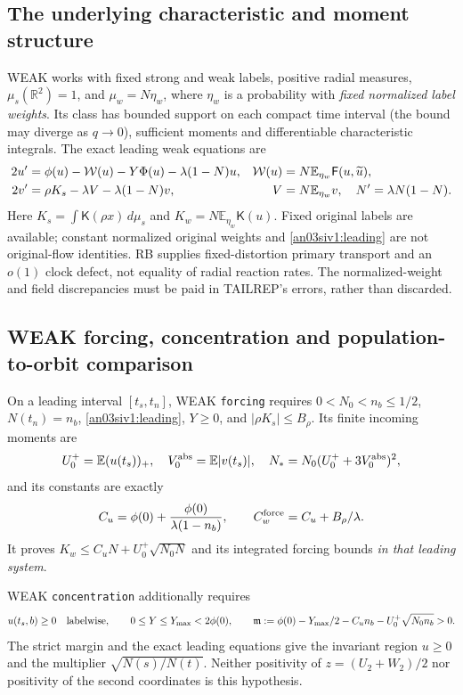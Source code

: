 \documentclass[11pt]{article}
\numberwithin{equation}{section}
\theoremstyle{remark}\newtheorem{remark}[proposition]{Remark}
\newcommand{\dd}{\,d}\newcommand{\E}{\mathbb E}
\newcommand{\Kfun}{\mathsf K}\newcommand{\Ffun}{\mathsf F}
\begin{document}
\subsection*{The underlying characteristic and moment structure}
WEAK works with fixed strong and weak labels, positive radial measures,
$\mu_s(\mathbb R^2)=1$, and $\mu_w=N\eta_w$, where $\eta_w$ is a
probability with \emph{fixed normalized label weights}. Its class has
bounded support on each compact time interval (the bound may diverge
as $q\to0$), sufficient moments and differentiable characteristic
integrals. The exact leading weak equations are
\begin{align}
 2u'&=\phi(u)-\mathcal W(u)-Y\Phi(u)-\lambda(1-N)u,
 &\mathcal W(u)&=N\E_{\eta_w}\Ffun(u,\widetilde u),\notag\\
 2v'&=\rho K_s-\lambda V-\lambda(1-N)v,
 &V&=N\E_{\eta_w}v,\quad N'=\lambda N(1-N).
 \label{an03siv1:leading}
\end{align}
Here $K_s=\int\Kfun(\rho x)\dd\mu_s$ and
$K_w=N\E_{\eta_w}\Kfun(u)$. Fixed original labels are available;
constant normalized original weights and \eqref{an03siv1:leading}
are not original-flow identities. RB supplies fixed-distortion primary
transport and an $o(1)$ clock defect, not equality of radial reaction
rates. The normalized-weight and field discrepancies must be paid in
TAILREP's errors, rather than discarded.

\subsection*{WEAK forcing, concentration and population-to-orbit comparison}
On a leading interval $[t_s,t_n]$, WEAK \texttt{forcing} requires
$0<N_0<n_b\le1/2$, $N(t_n)=n_b$, \eqref{an03siv1:leading},
$Y\ge0$, and $|\rho K_s|\le B_\rho$. Its finite incoming moments are
\[
 U_0^+=\E(u(t_s))_+,\quad V_0^{\rm abs}=\E|v(t_s)|,\quad
 N_*=N_0(U_0^++3V_0^{\rm abs})^2,
\]
and its constants are exactly
\begin{equation}
 C_u=\phi(0)+\frac{\phi(0)}{\lambda(1-n_b)},\qquad
 C_w^{\rm force}=C_u+B_\rho/\lambda.
 \label{an03siv1:forcingconstants}
\end{equation}
It proves $K_w\le C_uN+U_0^+\sqrt{N_0N}$ and its integrated
forcing bounds \emph{in that leading system}.

WEAK \texttt{concentration} additionally requires
\begin{equation}
 u(t_s,b)\ge0\quad\hbox{labelwise},\qquad
 0\le Y\le Y_{\max}<2\phi(0),\qquad
 \mathfrak m:=\phi(0)-Y_{\max}/2-C_un_b-U_0^+\sqrt{N_0n_b}>0.
 \label{an03siv1:returnhyp}
\end{equation}
The strict margin and the exact leading equations give the invariant
region $u\ge0$ and the multiplier $\sqrt{N(s)/N(t)}$.
Neither positivity of $z=(U_2+W_2)/2$ nor positivity of the second
coordinates is this hypothesis.
\end{document}

